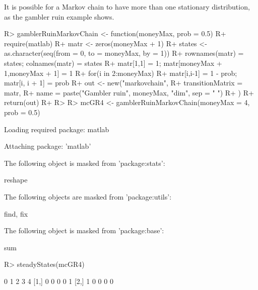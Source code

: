 \documentclass[
  nojss]{jss}
\begin{document}
It is possible for a Markov chain to have more than one stationary distribution, as the gambler ruin example shows.

\begin{CodeChunk}

\begin{CodeInput}
R> gamblerRuinMarkovChain <- function(moneyMax, prob = 0.5) {
R+   require(matlab)
R+   matr <- zeros(moneyMax + 1)
R+   states <- as.character(seq(from = 0, to = moneyMax, by = 1))
R+   rownames(matr) = states; colnames(matr) = states
R+   matr[1,1] = 1; matr[moneyMax + 1,moneyMax + 1] = 1
R+   for(i in 2:moneyMax)
R+   { matr[i,i-1] = 1 - prob; matr[i, i + 1] = prob   }
R+   out <- new("markovchain",  
R+            transitionMatrix = matr, 
R+            name = paste("Gambler ruin", moneyMax, "dim", sep = " ")
R+            )
R+   return(out)
R+ }
R> 
R> mcGR4 <- gamblerRuinMarkovChain(moneyMax = 4, prob = 0.5)
\end{CodeInput}

\begin{CodeOutput}
Loading required package: matlab
\end{CodeOutput}

\begin{CodeOutput}

Attaching package: 'matlab'
\end{CodeOutput}

\begin{CodeOutput}
The following object is masked from 'package:stats':

    reshape
\end{CodeOutput}

\begin{CodeOutput}
The following objects are masked from 'package:utils':

    find, fix
\end{CodeOutput}

\begin{CodeOutput}
The following object is masked from 'package:base':

    sum
\end{CodeOutput}

\begin{CodeInput}
R> steadyStates(mcGR4)
\end{CodeInput}

\begin{CodeOutput}
     0 1 2 3 4
[1,] 0 0 0 0 1
[2,] 1 0 0 0 0
\end{CodeOutput}
\end{CodeChunk}
\end{document}
